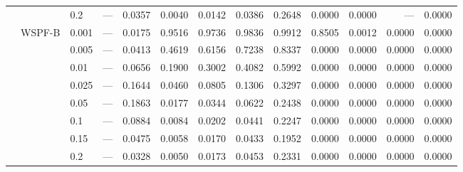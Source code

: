 {\begin{longtable}{@{}lllrrrrrrrrrr@{}}
 &  & 0.2 & --- & 0.0357 & 0.0040 & 0.0142 & 0.0386 & 0.2648 & 0.0000 & 0.0000 & --- & 0.0000 \\
 & WSPF-B & 0.001 & --- & 0.0175 & 0.9516 & 0.9736 & 0.9836 & 0.9912 & 0.8505 & 0.0012 & 0.0000 & 0.0000 \\
 &  & 0.005 & --- & 0.0413 & 0.4619 & 0.6156 & 0.7238 & 0.8337 & 0.0000 & 0.0000 & 0.0000 & 0.0000 \\
 &  & 0.01 & --- & 0.0656 & 0.1900 & 0.3002 & 0.4082 & 0.5992 & 0.0000 & 0.0000 & 0.0000 & 0.0000 \\
 &  & 0.025 & --- & 0.1644 & 0.0460 & 0.0805 & 0.1306 & 0.3297 & 0.0000 & 0.0000 & 0.0000 & 0.0000 \\
 &  & 0.05 & --- & 0.1863 & 0.0177 & 0.0344 & 0.0622 & 0.2438 & 0.0000 & 0.0000 & 0.0000 & 0.0000 \\
 &  & 0.1 & --- & 0.0884 & 0.0084 & 0.0202 & 0.0441 & 0.2247 & 0.0000 & 0.0000 & 0.0000 & 0.0000 \\
 &  & 0.15 & --- & 0.0475 & 0.0058 & 0.0170 & 0.0433 & 0.1952 & 0.0000 & 0.0000 & 0.0000 & 0.0000 \\
 &  & 0.2 & --- & 0.0328 & 0.0050 & 0.0173 & 0.0453 & 0.2331 & 0.0000 & 0.0000 & 0.0000 & 0.0000 \\
\end{longtable}
}
